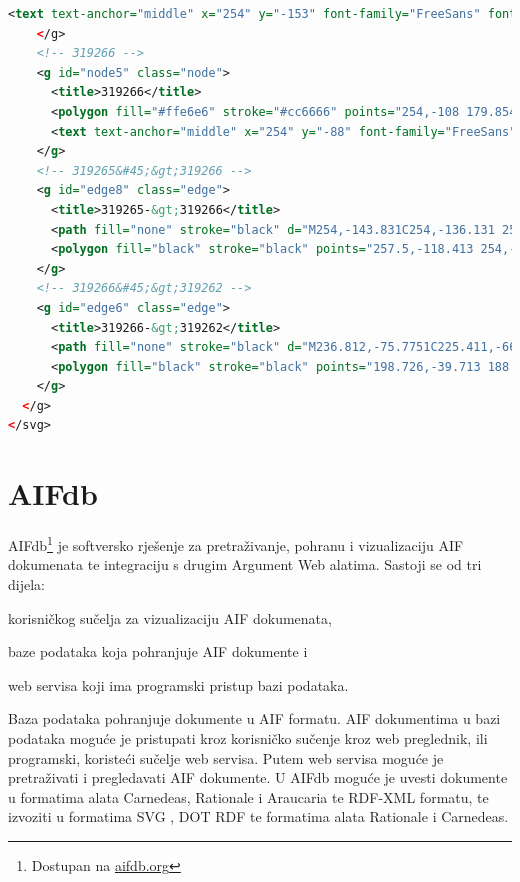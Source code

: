 \begin{lstlisting}[caption={Primjer AIF SVG dokumenta},label={lst:aif_svg},language=XML, captionpos=b, basicstyle=\scriptsize]
      <text text-anchor="middle" x="254" y="-153" font-family="FreeSans" font-size="10.00">ispitu iz PZUIS-a.</text>
    </g>
    <!-- 319266 -->
    <g id="node5" class="node">
      <title>319266</title>
      <polygon fill="#ffe6e6" stroke="#cc6666" points="254,-108 179.854,-90 254,-72 328.146,-90 254,-108" />
      <text text-anchor="middle" x="254" y="-88" font-family="FreeSans" font-size="10.00">Default Conflict</text>
    </g>
    <!-- 319265&#45;&gt;319266 -->
    <g id="edge8" class="edge">
      <title>319265-&gt;319266</title>
      <path fill="none" stroke="black" d="M254,-143.831C254,-136.131 254,-126.974 254,-118.417" />
      <polygon fill="black" stroke="black" points="257.5,-118.413 254,-108.413 250.5,-118.413 257.5,-118.413" />
    </g>
    <!-- 319266&#45;&gt;319262 -->
    <g id="edge6" class="edge">
      <title>319266-&gt;319262</title>
      <path fill="none" stroke="black" d="M236.812,-75.7751C225.411,-66.3402 210.148,-53.709 196.802,-42.6634" />
      <polygon fill="black" stroke="black" points="198.726,-39.713 188.791,-36.0336 194.263,-45.1057 198.726,-39.713" />
    </g>
  </g>
</svg>

\end{lstlisting}
\section{AIFdb}
\label{sec:aifdb}


AIFdb\footnote{Dostupan na \url{aifdb.org}} \citep{lawrence2012aifdb} 
je softversko rješenje za pretraživanje, pohranu i vizualizaciju AIF dokumenata te
integraciju s drugim Argument Web alatima. 
Sastoji se od tri dijela:
\begin{enumerate*}
    \item korisničkog sučelja za vizualizaciju AIF dokumenata,
    \item baze podataka koja pohranjuje AIF dokumente i
    \item web servisa koji ima programski pristup bazi podataka.
\end{enumerate*}
Baza podataka pohranjuje dokumente u AIF formatu. 
AIF dokumentima u bazi podataka moguće je pristupati kroz korisničko sučenje 
kroz web preglednik, ili programski, koristeći sučelje web servisa.  
Putem web servisa moguće je pretraživati i pregledavati AIF dokumente. 
U AIFdb moguće je uvesti  dokumente u formatima alata 
Carnedeas, Rationale i Araucaria te RDF-XML formatu, te izvoziti 
u formatima SVG , DOT 
RDF te formatima alata Rationale i Carnedeas. 

